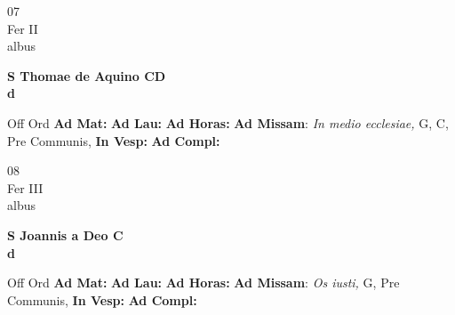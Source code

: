 \documentclass[10pt, openany]{book}
\begin{document}
        \begin{center}
            \begin{minipage}{3.5in}
                \vspace{2em}
                \begin{minipage}{0.5in}
                    {\Huge 07} \\
                    {\normalsize Fer II} \\
                    {\normalsize albus}
                \end{minipage}
                \begin{minipage}{3.0in}
                    \textbf{ \large S Thomae de Aquino CD \\
                    \textnormal{\normalsize d}} \\ 
                \end{minipage}
                \begin{justify}Off Ord
                    \textbf{Ad Mat: }
                    \textbf{Ad Lau: }
                    \textbf{Ad Horas: }\textbf{Ad Missam}: \textit{In medio ecclesiae,} G, C, Pre Communis,  
                    \textbf{In Vesp: }
                    \textbf{Ad Compl: }
                \end{justify}
            \end{minipage}
        \end{center}
    
        \begin{center}
            \begin{minipage}{3.5in}
                \vspace{2em}
                \begin{minipage}{0.5in}
                    {\Huge 08} \\
                    {\normalsize Fer III} \\
                    {\normalsize albus}
                \end{minipage}
                \begin{minipage}{3.0in}
                    \textbf{ \large S Joannis a Deo C \\
                    \textnormal{\normalsize d}} \\ 
                \end{minipage}
                \begin{justify}Off Ord
                    \textbf{Ad Mat: }
                    \textbf{Ad Lau: }
                    \textbf{Ad Horas: }\textbf{Ad Missam}: \textit{Os iusti,} G, Pre Communis,  
                    \textbf{In Vesp: }
                    \textbf{Ad Compl: }
                \end{justify}
            \end{minipage}
        \end{center}
    
\end{document}
